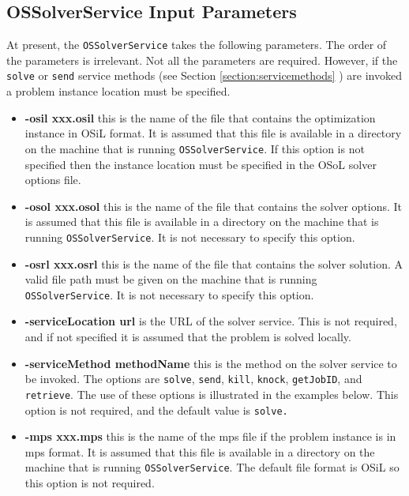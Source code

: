 \documentclass[11pt]{article}
\renewcommand{\_}{{\char"5F}}
\renewcommand{\{}{{\char"7B}}
\renewcommand{\}}{{\char"7D}}
\renewcommand{\^}{{\char"0D}}
\renewcommand{\'}{{\char"0D}}
\begin{document}
\subsection{OSSolverService Input Parameters}

At present, the {\tt OSSolverService} takes the following parameters. The order of the parameters is irrelevant.  Not all the parameters are required. However, if the {\tt solve} or {\tt send} service    methods  (see Section \ref{section:servicemethods} ) are invoked a problem instance location must be specified.

\begin{itemize}

\item[] {\bf -osil xxx.osil}  this is the name of the file that contains the optimization instance in OSiL format. It is assumed that this file is available in a directory on the machine that is running {\tt OSSolverService}. If this option is not specified then the instance location must be specified in the OSoL solver options file.

\item[] {\bf -osol xxx.osol}  this is the name of the file that contains the solver options. It is assumed that this file is available in a directory on the machine that is running {\tt OSSolverService}. It is not necessary to specify this option.

\item[] {\bf -osrl xxx.osrl}  this is the name of the file that contains the solver solution. A valid file path must be given on the machine that is running {\tt OSSolverService}. It is not necessary to specify this option.

\item[] {\bf -serviceLocation url}  is the URL of the solver service. This is not required, and if not specified it is assumed that the problem is solved locally.

\item[] {\bf -serviceMethod  methodName}  this is  the method on the solver service to be invoked. The options are {\tt solve}, {\tt send}, {\tt kill}, {\tt knock}, {\tt getJobID}, and {\tt retrieve}. The use of these options is illustrated in the examples below. This option is not required, and the default value is {\tt solve.}

\item[] {\bf -mps  xxx.mps}  this is the name of the mps file if the problem instance is in mps format. It is assumed that this file is available in a directory on the machine that is running {\tt OSSolverService}. The default file format is OSiL so this option is not required.


\end{itemize}
\end{document}
